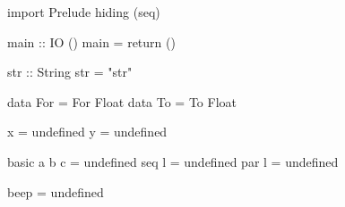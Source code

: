 \begin{code}
import Prelude hiding (seq)

main :: IO ()
main = return ()

str :: String
str = "str"

data For = For Float
data To = To Float

x = undefined
y = undefined

basic a b c = undefined
seq l = undefined
par l = undefined

beep = undefined
\end{code}

